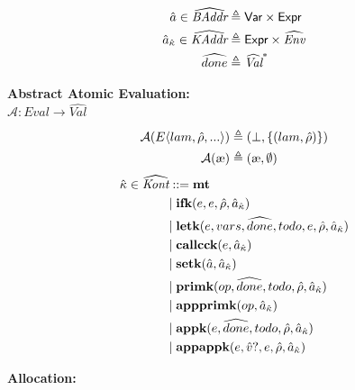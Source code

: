 \documentclass[12pt,draft]{article}
\newcommand\mae{\ensuremath{\text{\ae}}}
\begin{document}
\begin{multicols*}{2}
\begin{align*}
    \hat{a} \in \widehat{\textit{BAddr}}
    &\triangleq
      \textsf{Var} \times \textsf{Expr} \\
    \hat{a}_{\hat{\kappa}} \in \widehat{\textit{KAddr}}
    &\triangleq
      \textsf{Expr} \times \widehat{\textit{Env}} \\
    \widehat{done} &\triangleq \widehat{\textit{Val}}^*
                     \end{align*}
  \begin{center}
    \textbf{Abstract Atomic Evaluation:} \\
    $\mathcal{A} : \textit{Eval} \rightarrow \widehat{\textit{Val}}$
  \end{center}
  \vspace{-7mm}
  \begin{align*}
    \mathcal{A}(E\langle lam , \aenv , ... \rangle)
    &\triangleq (\bot , \{(lam , \aenv)\}) \\
    \mathcal{A}(\mae)
    &\triangleq (\mae , \emptyset) \\
  \end{align*}
  \vfill\null
  \columnbreak
  \begin{align*}
    \hat{\kappa} \in \widehat{\textit{Kont}}
    &::= \textbf{mt} \\
    &|\; \textbf{ifk}(e, e, \hat{\rho}, \hat{a}_{\hat{\kappa}}) \\
    &|\; \textbf{letk}(e, vars, \widehat{done}, todo, e , \hat{\rho}, \hat{a}_{\hat{\kappa}}) \\
    &|\; \textbf{callcck}(e, \hat{a}_{\hat{\kappa}}) \\
    &|\; \textbf{setk}(\hat{a}, \hat{a}_{\hat{\kappa}}) \\
    &|\; \textbf{primk}(op, \widehat{done}, todo, \hat{\rho}, \hat{a}_{\hat{\kappa}}) \\
    &|\; \textbf{appprimk}(op, \hat{a}_{\hat{\kappa}}) \\
    &|\; \textbf{appk}(e, \widehat{done}, todo, \hat{\rho}, \hat{a}_{\hat{\kappa}}) \\
    &|\; \textbf{appappk}(e, \hat{v}?, e, \hat{\rho}, \hat{a}_{\hat{\kappa}}) \\
  \end{align*}
  \begin{center}
    \textbf{Allocation:}
  \end{center}

\end{multicols*}
\end{document}
